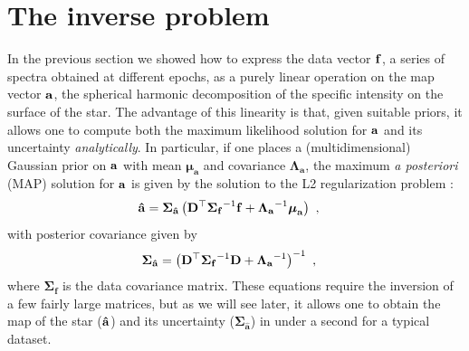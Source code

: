 \documentclass[modern]{aastex631}
\begin{document}
\section{The inverse problem}
\label{sec:inverse}
%
In the previous section we showed how to express the data vector ${\mathbf{f}}$, a series of spectra obtained at different epochs, as a purely linear operation on the map vector ${\mathbf{a}}$, the spherical harmonic decomposition of the specific intensity on the surface of the star. 
The advantage of this linearity is that, given suitable priors, it allows one to compute both the maximum likelihood solution for ${\mathbf{a}}$ and its uncertainty \emph{analytically}. 
In particular, if one places a (multidimensional) Gaussian prior on ${\mathbf{a}}$ with mean $\boldsymbol{\mu}_\mathbf{a}$ and covariance $\boldsymbol{\Lambda}_\mathbf{a}$, the maximum \emph{a posteriori} (MAP) solution for ${\mathbf{a}}$ is given by the solution to the L2 regularization problem \citep[see, e.g.,][]{Luger2016}:
%
\begin{align}
    \label{eq:inverse:ahat}
    {\ensuremath{\mathbf{\hat{a}}}} & =
    \boldsymbol{\Sigma}_\mathbf{\hat{a}}
    \left(
    {\mathbf{D}}^\top
    {\boldsymbol{\Sigma}_\mathbf{f}}^{-1}
    {\mathbf{f}}
    +
    {\boldsymbol{\Lambda}_{{\mathbf{a}}}}^{-1} \boldsymbol{\mu}_\mathbf{a}
    \right)
    \hskip 0.33em,
\end{align}
%
with posterior covariance given by
%
\begin{align}
    \label{eq:inverse:acov}
    \boldsymbol{\Sigma}_\mathbf{\hat{a}} & =
    \left(
    {\mathbf{D}}^\top
    {\boldsymbol{\Sigma}_\mathbf{f}}^{-1}
    {\mathbf{D}}
    +
    {\boldsymbol{\Lambda}_{{\mathbf{a}}}}^{-1}
    \right)^{-1}
    \hskip 0.33em,
\end{align}
%
where $\boldsymbol{\Sigma}_\mathbf{f}$ is the data covariance matrix. 
These equations require the inversion of a few fairly large matrices, but as we will see later, it allows one to obtain the map of the star (${\mathbf{\hat{a}}}$) and its uncertainty ($\boldsymbol{\Sigma}_{\mathbf{\hat{a}}}$) in under a second for a typical dataset.
\end{document}
